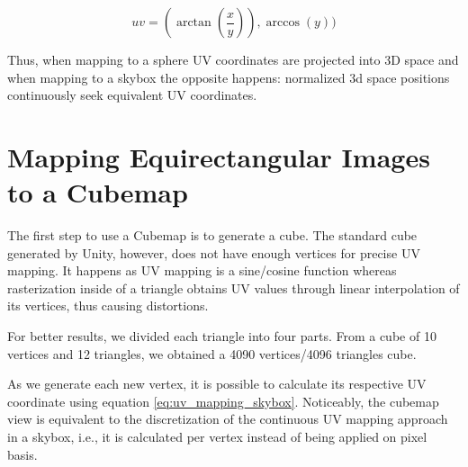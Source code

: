\documentclass[12pt]{article}
\begin{document}
\begin{equation}
uv = (\arctan(\frac{x}{y})), \arccos(y))
\label{eq:uv_mapping_skybox}
\end{equation}

Thus, when mapping to a sphere UV coordinates are projected into 3D space and when mapping to a skybox the opposite happens: normalized 3d space positions continuously seek equivalent UV coordinates.

\section{Mapping Equirectangular Images to a Cubemap}
The first step to use a Cubemap is to generate a cube. The standard cube generated by Unity, however, does not have enough vertices for precise UV mapping. It happens as UV mapping is a sine/cosine function whereas rasterization inside of a triangle obtains UV values through linear interpolation of its vertices, thus causing distortions.

For better results, we divided each triangle into four parts. From a cube of 10 vertices and 12 triangles, we obtained a 4090 vertices/4096 triangles cube.

As we generate each new vertex, it is possible to calculate its respective UV coordinate using equation \ref{eq:uv_mapping_skybox}. Noticeably, the cubemap view is equivalent to the discretization of the continuous UV mapping approach in a skybox, i.e., it is calculated per vertex instead of being applied on pixel basis.
\end{document}
